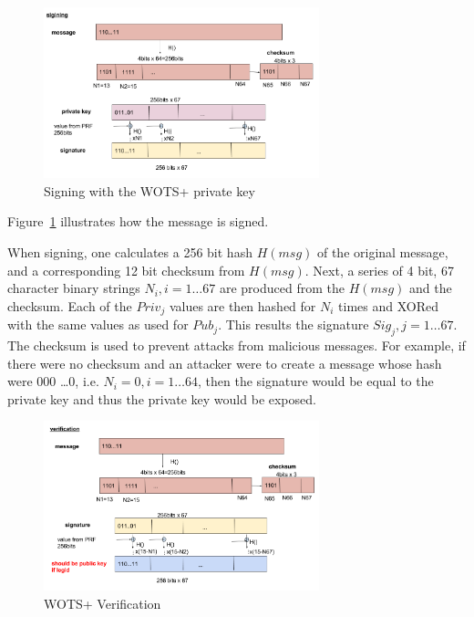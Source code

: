 \documentclass[a4paper,10pt,twocolumn]{article}
\begin{document}
 \begin{figure}[ht]
	\begin{center}
	\includegraphics[width=80mm]{wots_sign.png}
	  \caption{Signing with the WOTS+ private key}
    \label{fig:wots_sign}
	\end{center}
 \end{figure}

 Figure~\ref{fig:wots_sign} illustrates how the message is signed.

 When signing, one calculates a 256 bit hash \( H(msg) \) of the original message, and a corresponding 12 bit checksum from \( H(msg) \).
 Next, a series of 4 bit, 67 character binary strings \(N_i,i=1 \ldots 67\)  are produced from the \(H(msg)\) and the checksum. 
 Each of the \( Priv_j \) values are then hashed for \(N_i\) times and XORed with the same 
 values as used for \( Pub_{j} \). This results the signature \( Sig_j, j=1 \ldots 67 \). The checksum is used to prevent 
 attacks from malicious messages. For example, if there were no checksum and an attacker were to create a message whose hash were 000 
 \ldots 0, i.e. \( N_i = 0, i=1 \ldots 64 \), then the signature would be equal to the private key and thus the private key would be 
 exposed.

 \begin{figure}[ht]
	\begin{center}
	\includegraphics[width=80mm]{wots_veri.png}
	  \caption{WOTS+ Verification}
    \label{fig:wots_veri}
	\end{center}
 \end{figure}
\end{document}
